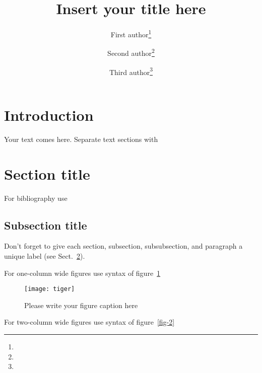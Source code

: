 \documentclass{webofc}
\begin{document}
%
\title{Insert your title here}
%
%

\author{First author\fnsep\thanks{} \and
        Second author\fnsep\thanks{} \and
        Third author\fnsep\thanks{}
}


%
\maketitle
%
\section{Introduction}
\label{intro}
Your text comes here. Separate text sections with
\section{Section title}
\label{sec-1}
For bibliography use \cite{RefJ}
\subsection{Subsection title}
\label{sec-2}
Don't forget to give each section, subsection, subsubsection, and
paragraph a unique label (see Sect.~\ref{sec-1}).

For one-column wide figures use syntax of figure~\ref{fig-1}
\begin{figure}
\centering
\texttt{[image: tiger]}
\caption{Please write your figure caption here}
\label{fig-1}       %
\end{figure}

For two-column wide figures use syntax of figure~\ref{fig-2}
\begin{figure*}
\centering
\vspace*{5cm}       %
\caption{Please write your figure caption here}
\label{fig-2}       %
\end{figure*}
\end{document}
